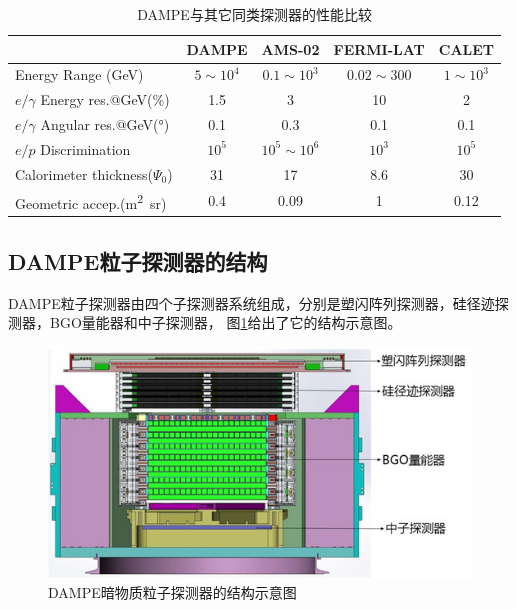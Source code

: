 \begin{table}[htb]
	\centering
	\caption{DAMPE与其它同类探测器的性能比较}
	\label{tab:introduction:dampe_comparison}
	\begin{threeparttable}
	\begin{tabulary}{\linewidth}{LCCCC}
		\toprule[1.5pt]
		  & DAMPE & AMS-02 & FERMI-LAT & CALET \\ 
		\midrule[1pt]
		Energy Range (\si{GeV}) & $5\sim10^4$ & $0.1\sim10^3$ & $0.02\sim300$ & $1\sim10^3$ \\ 
		$e/\gamma$ Energy res.@\si{GeV}(\si{\percent}) & 1.5 & 3 & 10 & 2 \\ 
		$e/\gamma$ Angular res.@\si{GeV}(\si{\degree}) & 0.1 & 0.3 & 0.1 & 0.1 \\ 
		$e/p$ Discrimination& $10^5$ & $10^5\sim10^6$ & $10^3$ & $10^5$ \\ 
		Calorimeter thickness($\Psi_0$) & 31 & 17 & 8.6 & 30 \\ 
		Geometric accep.(\si{\meter\squared\steradian}) & 0.4 & 0.09 & 1 & 0.12 \\ 
		\bottomrule[1.5pt] 
	\end{tabulary}
	\end{threeparttable}
\end{table}

\subsection{DAMPE粒子探测器的结构}
DAMPE粒子探测器由四个子探测器系统组成，分别是塑闪阵列探测器，硅径迹探测器，BGO量能器和中子探测器，
图\ref{fig:introduction:dampe_structure}给出了它的结构示意图。
\begin{figure}[htb]
	\centering
	\includegraphics[width=0.8\linewidth]{chap/introduction/fig/dampe_structure_2}
	\caption{DAMPE暗物质粒子探测器的结构示意图}
	\label{fig:introduction:dampe_structure}
\end{figure}


